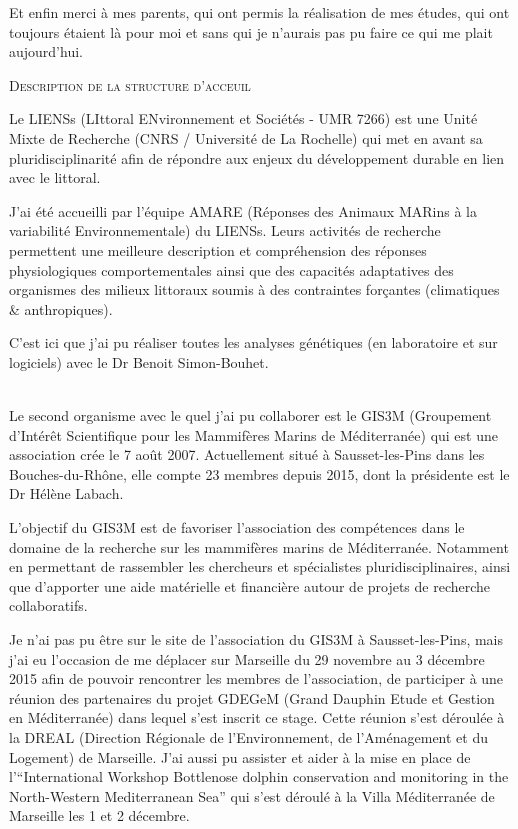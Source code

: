 \documentclass[a4paper,12pt,twoside]{article}\usepackage[]{graphicx}\usepackage[]{color}
\begin{document}
Et enfin merci à mes parents, qui ont permis la réalisation de mes études, qui ont toujours étaient là pour moi et sans qui je n'aurais pas pu faire ce qui me plait aujourd'hui.

\newpage


\begin{center}
 \textsc{\LARGE Description de la structure d'acceuil}\\[2cm]
\end{center}

Le LIENSs (LIttoral ENvironnement et Sociétés - UMR 7266) est une Unité Mixte de Recherche (CNRS / Université de La Rochelle) qui met en avant sa pluridisciplinarité afin de répondre aux enjeux du développement durable en lien avec le littoral.

J’ai été accueilli par l’équipe AMARE (Réponses des Animaux MARins à la variabilité Environnementale) du LIENSs. Leurs activités de recherche permettent une meilleure description et compréhension des réponses physiologiques comportementales ainsi que des capacités adaptatives des organismes des milieux littoraux soumis à des contraintes forçantes (climatiques & anthropiques). 

C'est ici que j'ai pu réaliser toutes les analyses génétiques (en laboratoire et sur logiciels) avec le Dr Benoit Simon-Bouhet.

~~\\

Le second organisme avec le quel j'ai pu collaborer est le GIS3M (Groupement d’Intérêt Scientifique pour les Mammifères Marins de Méditerranée) qui est une association crée le 7 août 2007. Actuellement situé à Sausset-les-Pins dans les Bouches-du-Rhône, elle compte 23 membres depuis 2015, dont la présidente est le Dr Hélène Labach.

L’objectif du GIS3M est de favoriser l'association des compétences dans le domaine de la recherche sur les mammifères marins de Méditerranée. Notamment en permettant de rassembler les chercheurs et spécialistes pluridisciplinaires, ainsi que d'apporter une aide matérielle et financière autour de projets de recherche collaboratifs.

Je n'ai pas pu être sur le site de l'association du GIS3M à Sausset-les-Pins, mais j'ai eu l'occasion de me déplacer sur Marseille du 29 novembre au 3 décembre 2015 afin de pouvoir rencontrer les membres de l'association, de participer à une réunion des partenaires du projet GDEGeM (Grand Dauphin Etude et Gestion en Méditerranée) dans lequel s'est inscrit ce stage. Cette réunion s'est déroulée à la DREAL (Direction Régionale de l'Environnement, de l'Aménagement et du Logement) de Marseille. J'ai aussi pu assister et aider à la mise en place de l'``International Workshop Bottlenose dolphin conservation and monitoring in the North-Western Mediterranean Sea'' qui s'est déroulé à la Villa Méditerranée de Marseille les 1 et 2 décembre.
\end{document}
